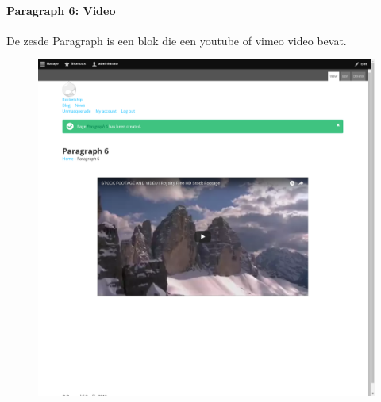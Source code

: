 \paragraph{Paragraph 6: Video}
De zesde Paragraph is een blok die een youtube of vimeo video bevat.
\begin{figure}[h]
\includegraphics[width=1\textwidth]{img/p006.png}
\end{figure}

\clearpage
